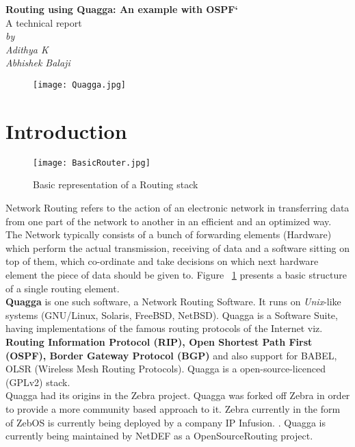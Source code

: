 \documentclass{article}
\begin{document}
\begin{titlepage}
\begin{center}
    \Large\textbf{Routing using Quagga: An example with OSPF`}\\
    A technical report\\
    \textit{by}\\
    \large\textit{Adithya K \\ Abhishek Balaji}
\end{center}
\vspace{2cm}
\begin{figure}[ht!]
  \centering
  \texttt{[image: Quagga.jpg]}
\end{figure}

\end{titlepage}
\tableofcontents
\clearpage
\section{Introduction}
\begin{figure}[ht!]
  \centering
  \texttt{[image: BasicRouter.jpg]}
  \caption{Basic representation of a Routing stack}
  \label{fig:basicrouter}
\end{figure}
Network Routing refers to the action of an electronic network in transferring data 
from one part of the network to another in an efficient and an optimized way. 
The Network typically consists of a bunch of forwarding elements (Hardware) which 
perform the actual transmission, receiving of data and a software sitting on top of them, 
which co-ordinate and take decisions on which next hardware element the piece of data 
should be given to. Figure~ \ref{fig:basicrouter} presents a basic structure 
of a single routing element.\\
\textbf{Quagga} is one such software, a Network Routing Software. It runs on \textit{Unix}-like systems 
(GNU/Linux, Solaris, FreeBSD, NetBSD). Quagga is a Software Suite, having implementations 
of the famous routing protocols of the Internet viz. \textbf{Routing Information Protocol (RIP), 
Open Shortest Path First (OSPF), Border Gateway Protocol (BGP)} and also support for 
BABEL, OLSR (Wireless Mesh Routing Protocols). Quagga is a open-source-licenced (GPLv2) stack.\\
Quagga had its origins in the Zebra project. Quagga was forked off Zebra in order to provide a
more community based approach to it. Zebra currently in the form of ZebOS is currently being
deployed by a company IP Infusion. \cite{zebraipinfusion}. Quagga is currently being maintained
by NetDEF \cite{netdef} as a OpenSourceRouting project.
\end{document}
